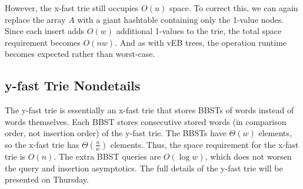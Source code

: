 \documentclass[11pt]{article}
\begin{document}
However, the x-fast trie still occupies $O(u)$ space. To correct this, we can again replace the array $A$ with a giant hashtable containing only the 1-value nodes. Since each insert adds $O(w)$ additional 1-values to the trie, the total space requirement becomes $O(n w)$. And as with vEB trees, the operation runtime becomes expected rather than worst-case.

\subsection{y-fast Trie Nondetails}
The y-fast trie is essentially an x-fast trie that stores BBSTs of words instead of words themselves. Each BBST stores consecutive stored words (in comparison order, not insertion order) of the y-fast trie. The BBSTs have $\Theta(w)$ elements, so the x-fast trie has $\Theta(\frac{n}{w})$ elements. Thus, the space requirement for the x-fast trie is $O(n)$. The extra BBST queries are $O(\log w)$, which does not worsen the query and insertion asymptotics. The full details of the y-fast trie will be presented on Thursday.
\end{document}
